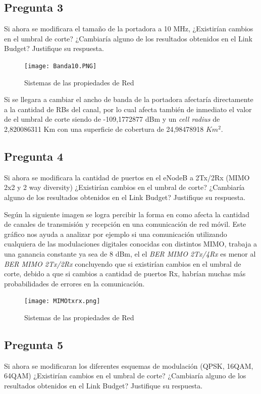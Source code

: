 \documentclass[Article, letterpaper,12pt]{article}
\begin{document}
\subsection{Pregunta 3}

Si ahora se modificara el tamaño de la portadora a 10 MHz, ¿Existirían cambios en el umbral de corte? ¿Cambiaría alguno
de los resultados obtenidos en el Link Budget? Justifique su respuesta.

\begin{figure}[H]
    \centering
    \texttt{[image: Banda10.PNG]}
    \caption{Sistemas de las propiedades de Red}
    \label{fig:my_label}
\end{figure}

Si se llegara a cambiar el ancho de banda de la portadora afectaría directamente a la cantidad de RBs del canal, por lo cual afecta también de inmediato el valor de el umbral de corte siendo de -109,1772877 dBm y un \textit{cell radius} de 2,820086311 Km  con una superficie de cobertura de 24,98478918 $Km^{2}$.

\subsection{Pregunta 4}
Si ahora se modificara la cantidad de puertos en el eNodeB a 2Tx/2Rx (MIMO 2x2 y 2 way diversity) ¿Existirían cambios en el
umbral de corte? ¿Cambiaría alguno de los resultados obtenidos en el Link Budget? Justifique su respuesta.

Según la siguiente imagen se logra percibir la forma en como afecta la cantidad de canales de transmisión y recepción en una comunicación de red móvil. Este gráfico nos ayuda a analizar por ejemplo si una comunicación utilizando cualquiera de las modulaciones digitales conocidas con distintos MIMO, trabaja a una ganancia constante ya sea de 8 dBm, el el \textit{BER MIMO 2Tx/4Rx} es menor al \textit{BER MIMO 2Tx/2Rx} concluyendo que si existirían cambios en el umbral de corte, debido a que si cambios a cantidad de puertos Rx, habrían muchas más probabilidades de errores en la comunicación.

\begin{figure}[H]
    \centering
    \texttt{[image: MIMOtxrx.png]}
    \caption{Sistemas de las propiedades de Red}
    \label{fig:my_label}
\end{figure}


\subsection{Pregunta 5}
Si ahora se modificaran los diferentes esquemas de modulación (QPSK, 16QAM, 64QAM) ¿Existirían cambios en el umbral
de corte? ¿Cambiaría alguno de los resultados obtenidos en el Link Budget? Justifique su respuesta.
\end{document}
